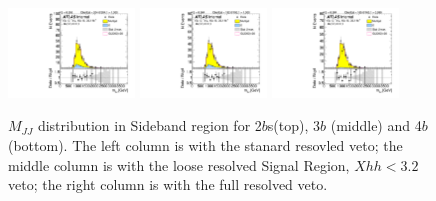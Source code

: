 \begin{figure}[htbp!]
\begin{center}
\includegraphics[width=0.3\textwidth,angle=-90]{figures/boosted/AppendixResveto/Moriond_FourTag_Sideband_mHH_l.pdf}
\includegraphics[width=0.3\textwidth,angle=-90]{figures/boosted/AppendixResveto/Moriond_resveto_FourTag_Sideband_mHH_l.pdf}
\includegraphics[width=0.3\textwidth,angle=-90]{figures/boosted/AppendixResveto/Moriond_fullresveto_FourTag_Sideband_mHH_l.pdf}\\
  \caption{ $M_{JJ}$ distribution in Sideband region for 2$b$s(top), 3$b$ (middle) and 4$b$ (bottom). The left column is with the stanard resovled veto; the middle column is with the loose resolved Signal Region, $Xhh < 3.2$ veto; the right column is with the full resolved veto.}
\label{fig:app-resveto-sb}
\end{center}
\end{figure}


